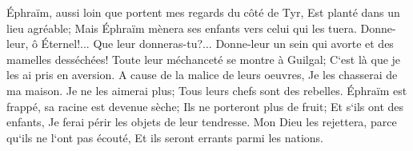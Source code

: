 \verse Éphraïm, aussi loin que portent mes regards du côté de Tyr, Est planté dans un lieu agréable; Mais Éphraïm mènera ses enfants vers celui qui les tuera. 
\verse Donne-leur, ô Éternel!... Que leur donneras-tu?... Donne-leur un sein qui avorte et des mamelles desséchées! 
\verse Toute leur méchanceté se montre à Guilgal; C`est là que je les ai pris en aversion. A cause de la malice de leurs oeuvres, Je les chasserai de ma maison. Je ne les aimerai plus; Tous leurs chefs sont des rebelles. 
\verse Éphraïm est frappé, sa racine est devenue sèche; Ils ne porteront plus de fruit; Et s`ils ont des enfants, Je ferai périr les objets de leur tendresse. 
\verse Mon Dieu les rejettera, parce qu`ils ne l`ont pas écouté, Et ils seront errants parmi les nations. 

